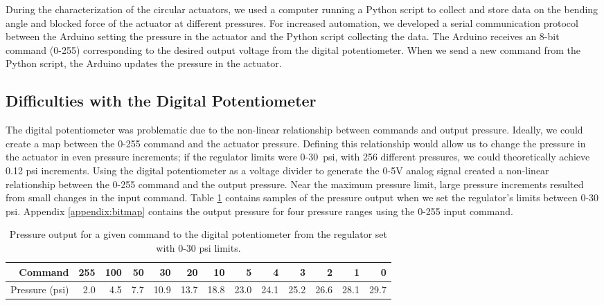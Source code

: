 During the characterization of the circular actuators, we used a computer running a Python script to collect and store data on the bending angle and blocked force of the actuator at different pressures. For increased automation, we developed a serial communication protocol between the Arduino setting the pressure in the actuator and the Python script collecting the data. The Arduino receives an 8-bit command (0-255) corresponding to the desired output voltage from the digital potentiometer. When we send a new command from the Python script, the Arduino updates the pressure in the actuator. 

\subsection{Difficulties with the Digital Potentiometer}

The digital potentiometer was problematic due to the non-linear relationship between commands and output pressure. Ideally, we could create a map between the 0-255 command and the actuator pressure. Defining this relationship would allow us to change the pressure in the actuator in even pressure increments; if the regulator limits were 0-30~psi, with 256 different pressures, we could theoretically achieve 0.12 psi increments. Using the digital potentiometer as a voltage divider to generate the 0-5V analog signal created a non-linear relationship between the 0-255 command and the output pressure. Near the maximum pressure limit, large pressure increments resulted from small changes in the input command. Table \ref{table:bitmap} contains samples of the pressure output when we set the regulator's limits between 0-30 psi. Appendix \ref{appendix:bitmap} contains the output pressure for four pressure ranges using the 0-255 input command. \\

\begin{table}[ht]
    \centering
    \begin{tabular}{|r|r|r|r|r|r|r|r|r|r|r|r|r|}
        \hline
        Command  & 255 & 100 & 50  & 30   & 20   & 10   & 5    & 4    & 3    & 2    & 1    & 0    \\ \hline
        Pressure (psi) & 2.0 & 4.5 & 7.7 & 10.9 & 13.7 & 18.8 & 23.0 & 24.1 & 25.2 & 26.6 & 28.1 & 29.7 \\ \hline
    \end{tabular}
    \caption{Pressure output for a given command to the digital potentiometer from the regulator set with 0-30 psi limits.}
    \label{table:bitmap}
\end{table}

